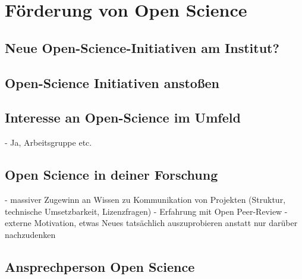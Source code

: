 \documentclass[11pt,a4paper]{article}
\begin{document}
\section{Förderung von Open Science} %
\subsection{Neue Open-Science-Initiativen am Institut?}

\subsection{Open-Science Initiativen anstoßen}


\subsection{Interesse an Open-Science im Umfeld} %
- Ja, Arbeitsgruppe etc.

\subsection{Open Science in deiner Forschung}
- massiver Zugewinn an Wissen zu Kommunikation von Projekten (Struktur, technische Umsetzbarkeit, Lizenzfragen)
- Erfahrung mit Open Peer-Review
- externe Motivation, etwas Neues tatsächlich auszuprobieren anstatt nur darüber nachzudenken


\subsection{Ansprechperson Open Science}
\end{document}
